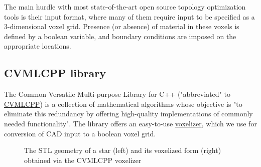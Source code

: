 

The main hurdle with most state-of-the-art open source topology optimization tools is their input format, where many of them require input to be specified as a 3-dimensional voxel grid. Presence (or absence) of material in these voxels is defined by a boolean variable, and boundary conditions are imposed on the appropriate locations. %

\subsection{CVMLCPP library}
The Common Versatile Multi-purpose Library for C++ ("abbreviated" to \href{http://tech.unige.ch/cvmlcpp/}{CVMLCPP}) is a collection of mathematical algorithms whose objective is "to eliminate this redundancy by offering high-quality implementations of commonly needed functionality". The library offers an easy-to-use \href{http://tech.unige.ch/cvmlcpp/source/doc/Voxelizer.html}{voxelizer}, which we use for conversion of CAD input to a boolean voxel grid.

\begin{figure}
\centering
\begin{subfigure}{
  \texttt{[image: Pictures/STLToVoxels/Star\_STL.png]}}
\end{subfigure}
\begin{subfigure}{
  \texttt{[image: Pictures/STLToVoxels/Star\_VTK\_Trans.png]}}
\end{subfigure}
\caption{The STL geometry of a star (left) and its voxelized form (right) obtained via the CVMLCPP voxelizer}
\label{fig: voxelizerStar}
\end{figure}

